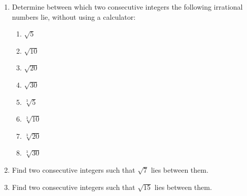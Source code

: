 \begin{eocexercises}{}
\begin{enumerate}[itemsep=5pt, label=\textbf{\arabic*}. ]
\item Determine between which two consecutive integers the following irrational numbers lie, without using a calculator:
\begin{multicols}{2}
    \begin{enumerate}[itemsep=5pt, label=\textbf{\alph*}. ] 
    \item $\sqrt{5}$ 
    \item $\sqrt{10}$ 
    \item $\sqrt{20}$ 
    \item $\sqrt{30}$ 
    \item $\sqrt[3]{5}$ 
    \item $\sqrt[3]{10}$ 
    \item $\sqrt[3]{20}$ 
    \item $\sqrt[3]{30}$ 
    \end{enumerate}
\end{multicols}

\item  Find two consecutive integers such that $\sqrt{7}$ lies between them.          
\item  Find two consecutive integers such that $\sqrt{15}$ lies between them.          





\end{enumerate}
\end{eocexercises}

